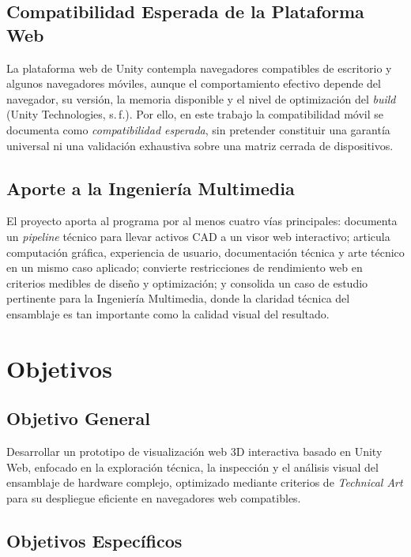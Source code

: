 \subsection*{Compatibilidad Esperada de la Plataforma Web}

La plataforma web de Unity contempla navegadores compatibles de escritorio y algunos navegadores móviles, aunque el comportamiento efectivo depende del navegador, su versión, la memoria disponible y el nivel de optimización del \textit{build} (Unity Technologies, s.\,f.). Por ello, en este trabajo la compatibilidad móvil se documenta como \textit{compatibilidad esperada}, sin pretender constituir una garantía universal ni una validación exhaustiva sobre una matriz cerrada de dispositivos.

\subsection*{Aporte a la Ingeniería Multimedia}

El proyecto aporta al programa por al menos cuatro vías principales: documenta un \textit{pipeline} técnico para llevar activos CAD a un visor web interactivo; articula computación gráfica, experiencia de usuario, documentación técnica y arte técnico en un mismo caso aplicado; convierte restricciones de rendimiento web en criterios medibles de diseño y optimización; y consolida un caso de estudio pertinente para la Ingeniería Multimedia, donde la claridad técnica del ensamblaje es tan importante como la calidad visual del resultado.

\section{Objetivos}

\subsection{Objetivo General}

Desarrollar un prototipo de visualización web 3D interactiva basado en Unity Web, enfocado en la exploración técnica, la inspección y el análisis visual del ensamblaje de hardware complejo, optimizado mediante criterios de \textit{Technical Art} para su despliegue eficiente en navegadores web compatibles.

\subsection{Objetivos Específicos}

